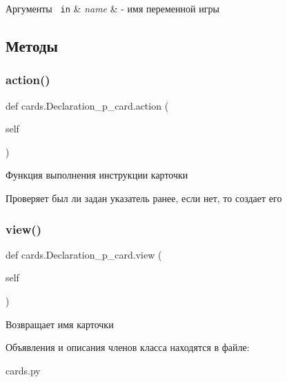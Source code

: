 \begin{DoxyParams}[1]{Аргументы}
\mbox{\texttt{ in}}  & {\em name} & -\/ имя переменной игры \\
\hline
\end{DoxyParams}


\subsection{Методы}
\mbox{\label{classcards_1_1_declaration__p__card_a258fbc709567b0e19eb6b2c6f1c9664f}} 
\subsubsection{\texorpdfstring{action()}{action()}}
{\footnotesize\ttfamily def cards.\+Declaration\+\_\+p\+\_\+card.\+action (\begin{DoxyParamCaption}\item[{}]{self }\end{DoxyParamCaption})}



Функция выполнения инструкции карточки 

Проверяет был ли задан указатель ранее, если нет, то создает его \mbox{\label{classcards_1_1_declaration__p__card_ade1c4873e4500e66bccf2a559195aad5}} 
\subsubsection{\texorpdfstring{view()}{view()}}
{\footnotesize\ttfamily def cards.\+Declaration\+\_\+p\+\_\+card.\+view (\begin{DoxyParamCaption}\item[{}]{self }\end{DoxyParamCaption})}



Возвращает имя карточки 



Объявления и описания членов класса находятся в файле\+:\begin{DoxyCompactItemize}
\item 
cards.\+py\end{DoxyCompactItemize}
